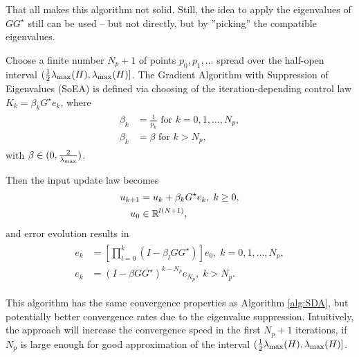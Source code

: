 That all makes this algorithm not solid. Still, the idea to apply the eigenvalues of $G G^{\star}$ still can be used -- but not directly, but by ''picking'' the compatible eigenvalues. 
\begin{alg}
	Choose a finite number $N_p + 1$ of points $p_0, p_1, \dots$ spread over the half-open interval $(\frac{1}{2}\lambda_{\mathrm{max}}(H), \lambda_{\mathrm{max}}(H)]$. 
	The Gradient Algorithm with Suppression of Eigenvalues (SoEA) is defined via choosing of the iteration-depending control law  $K_k = \beta_k G^\star e_k$, where 
	\begin{align}
	\begin{split}
	\beta_k &= \frac{1}{p_k} \text{ for } k = 0 , 1, \dots , N_p,\\
	\beta_k &= \beta  \text{ for } k > N_p,
	\end{split}
	\end{align}
	with $\beta \in (0, \frac{2}{\lambda_{\mathrm{max}}})$.
	
	Then the input update law becomes 
	\begin{align}
		u_{k+1} &= u_k + \beta_k G^\star e_k, \; k\geq 0,\\
		u_0 &\in {\mathbb{R}}^{l(N+1)}, 
	\end{align}
	and error evolution results in 
	\begin{align}
	\begin{split}
	e _{k} &= \left[\prod_{l = 0}^k (I - \beta_l  GG^\star) \right] e_{0}, \;  k = 0 , 1, \dots , N_p,\\
	e _{k} &=  (I - \beta GG^\star)^{k - N_p} e_{N_p}, \;  k > N_p.
	\end{split}
	\end{align}	
\end{alg}

This algorithm has the same convergence properties as Algorithm \ref{alg:SDA}, but potentially better convergence rates due to the eigenvalue suppression. Intuitively, the approach will increase the convergence speed in the first $N_p + 1$ iterations, if $N_p$ is large enough for good approximation of the interval $(\frac{1}{2} \lambda_{\mathrm{max}}(H), \lambda_{\mathrm{max}}(H)]$.

